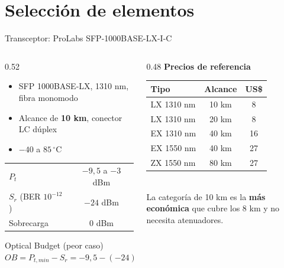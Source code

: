\documentclass[aspectratio=1610]{beamer}
\begin{document}
\section[Selección]{Selección de elementos}
\begin{frame}{Transceptor: ProLabs SFP-1000BASE-LX-I-C}
  \begin{columns}[T]
    \begin{column}{0.52\textwidth}
      \begin{itemize}
        \item SFP 1000BASE-LX, 1310 nm, fibra monomodo
        \item Alcance de \textbf{10 km}, conector LC dúplex
        \item $-40$ a $85\,^\circ$C
      \end{itemize}
      \vspace{0.1cm}
      \begin{tabular}{lc}
        \toprule
        $P_t$ & $-9{,}5$ a $-3$ dBm \\
        $S_r$ (BER $10^{-12}$) & $-24$ dBm \\
        Sobrecarga & $0$ dBm \\
        \bottomrule
      \end{tabular}
      \vspace{0.2cm}
      \begin{block}{Optical Budget (peor caso)}
        \centering
        $OB = P_{t,min} - S_r = -9{,}5 - (-24) = \mathbf{14{,}5\ dB}$
      \end{block}
    \end{column}
    \begin{column}{0.48\textwidth}
      \centering
      \textbf{Precios de referencia}\\[0.1cm]
      \small
      \begin{tabular}{lcc}
        \toprule
        \textbf{Tipo} & \textbf{Alcance} & \textbf{US\$} \\
        \midrule
        LX 1310 nm & 10 km & 8 \\
        LX 1310 nm & 20 km & 8 \\
        EX 1310 nm & 40 km & 16 \\
        EX 1550 nm & 40 km & 27 \\
        ZX 1550 nm & 80 km & 27 \\
        \bottomrule
      \end{tabular}\\[0.2cm]
      \normalsize La categoría de 10 km es la \textbf{más económica} que cubre los 8 km y no necesita atenuadores.
    \end{column}
  \end{columns}
\end{frame}
\end{document}
